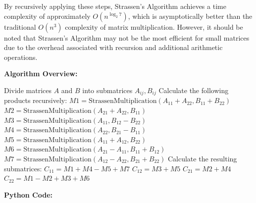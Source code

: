 \documentclass[12pt]{book} %
\begin{document}
By recursively applying these steps, Strassen's Algorithm achieves a time complexity of approximately $O(n^{\log_2{7}})$, which is asymptotically better than the traditional $O(n^3)$ complexity of matrix multiplication. However, it should be noted that Strassen's Algorithm may not be the most efficient for small matrices due to the overhead associated with recursion and additional arithmetic operations.

\textbf{Algorithm Overview:}
\FloatBarrier
\begin{algorithm}
\caption{Strassen's Algorithm for Matrix Multiplication}

\begin{algorithmic}
        \State {}
    \EndIf
    \State Divide matrices $A$ and $B$ into submatrices $A_{ij}, B_{ij}$
    \State Calculate the following products recursively:
        \State $M1 = \text{StrassenMultiplication}(A_{11} + A_{22}, B_{11} + B_{22})$
        \State $M2 = \text{StrassenMultiplication}(A_{21} + A_{22}, B_{11})$
        \State $M3 = \text{StrassenMultiplication}(A_{11}, B_{12} - B_{22})$
        \State $M4 = \text{StrassenMultiplication}(A_{22}, B_{21} - B_{11})$
        \State $M5 = \text{StrassenMultiplication}(A_{11} + A_{12}, B_{22})$
        \State $M6 = \text{StrassenMultiplication}(A_{21} - A_{11}, B_{11} + B_{12})$
        \State $M7 = \text{StrassenMultiplication}(A_{12} - A_{22}, B_{21} + B_{22})$
    \State Calculate the resulting submatrices:
        \State $C_{11} = M1 + M4 - M5 + M7$
        \State $C_{12} = M3 + M5$
        \State $C_{21} = M2 + M4$
        \State $C_{22} = M1 - M2 + M3 + M6$
    \State {}
\EndFunction
\end{algorithmic}
\end{algorithm}
\FloatBarrier
\textbf{Python Code: }
\FloatBarrier
\end{document}
